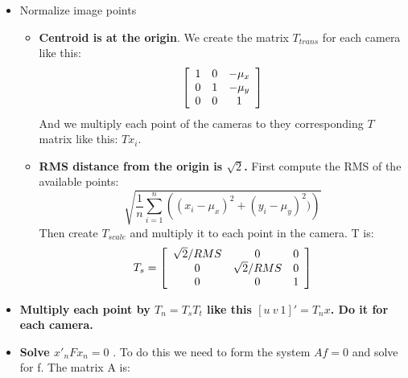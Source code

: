 \documentclass[a4paper,12pt]{article}
\begin{document}
	
\begin{itemize}
    \item Normalize image points
        \begin{itemize}
            \item \textbf{Centroid is at the origin}. We create the matrix $T_{trans}$ for each
                camera like this:
                \begin{equation}
                    \left [
                    \begin{array}[ ]{c c c}
                        1 & 0 & -\mu_x\\
                        0 & 1 & -\mu_y\\
                        0 & 0 & 1\\
                    \end{array}
                \right ]
                \end{equation}
                And we multiply each point of the cameras to they corresponding $T$ matrix like this:
                $Tx_i$.
            \item \textbf{RMS distance from the origin is $\sqrt{2}$.} First compute the RMS of the
                available points:
                \begin{equation}
                    \sqrt{ \frac{1}{n} \sum_{i=1}^n \left(  (x_i - \mu_x)^2 + (y_i- \mu_y)^2) \right) }
                \end{equation}
                Then create $T_{scale}$ and multiply it to each point in the camera. T is:
                \begin{equation}
                    T_s = \left[ 
                    \begin{array}[]{ccc}
                        \sqrt{2}/RMS & 0 & 0 \\
                        0 & \sqrt{2}/RMS  & 0 \\
                        0 & 0 & 1 
                    \end{array}
                     \right]
                \end{equation}
        \end{itemize}
    \item \textbf{Multiply each point by $T_n = T_sT_t$ like this $[u~ v~ 1]' = T_nx$. Do it for each camera.}
    \item \textbf{Solve $x'_nFx_n = 0$ }. To do this we need to form the system $Af = 0$ and solve for f.
        The matrix A is: \begin{equation}

\end{equation}
\end{itemize}
\end{document}
